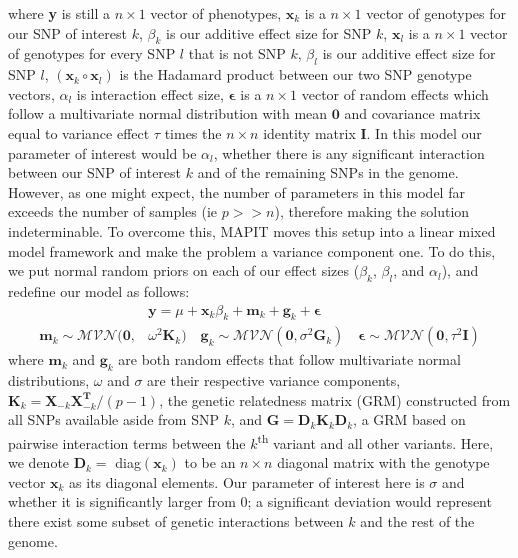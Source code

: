 \documentclass[12pt,a4paper]{article}
\begin{document}
where \textbf{y} is still a $n \times 1$ vector of phenotypes, $\textbf{x}_k$ is a $n \times 1$ vector of genotypes for our SNP of interest $k$, $\beta_k$ is our additive effect size for SNP $k$, $\textbf{x}_l$ is a $n \times 1$ vector of genotypes for every SNP $l$ that is not SNP $k$, $\beta_l$ is our additive effect size for SNP $l$, $(\textbf{x}_k \circ \textbf{x}_l)$ is the Hadamard product between our two SNP genotype vectors, $\alpha_l$ is interaction effect size, $\boldsymbol{\epsilon}$ is a $n \times 1$ vector of random effects which follow a multivariate normal distribution with mean $\textbf{0}$ and covariance matrix equal to variance effect $\tau$ times the $n \times n$ identity matrix $\textbf{I}$. In this model our parameter of interest would be $\alpha_l$, whether there is any significant interaction between our SNP of interest $k$ and of the remaining SNPs in the genome. However, as one might expect, the number of parameters in this model far exceeds the number of samples (ie $p >> n$), therefore making the solution indeterminable. To overcome this, MAPIT moves this setup into a linear mixed model framework and make the problem a variance component one. To do this, we put normal random priors on each of our effect sizes ($\beta_k$, $\beta_l$, and $\alpha_l$), and redefine our model as follows:
\begin{align}
    & \textbf{y} = \mu + \textbf{x}_k\beta_k + \textbf{m}_k + \textbf{g}_k + \boldsymbol{\epsilon} \\
    \textbf{m}_k \sim \mathcal{MVN}(\textbf{0}, &\omega^{2}\textbf{K}_k) \quad \textbf{g}_k \sim \mathcal{MVN}(\textbf{0}, \sigma^{2}\textbf{G}_k) \quad \boldsymbol{\epsilon} \sim \mathcal{MVN}(\textbf{0}, \tau^{2}\textbf{I}) \nonumber 
\end{align}
where $\textbf{m}_k$ and $\textbf{g}_k$ are both random effects that follow multivariate normal distributions, $\omega$ and $\sigma$ are their respective variance components, $\textbf{K}_k = \textbf{X}_{-k}\textbf{X}^{\textbf{T}}_{-k}/(p-1)$, the genetic relatedness matrix (GRM) constructed from all SNPs available aside from SNP $k$, and $\textbf{G} = \textbf{D}_k\textbf{K}_k\textbf{D}_k$, a GRM based on pairwise interaction terms between the $k$\textsuperscript{th} variant and all other variants. Here, we denote $\textbf{D}_k =$ diag$(\textbf{x}_k)$ to be an $n \times n$ diagonal matrix with the genotype vector $\textbf{x}_k$ as its diagonal elements. Our parameter of interest here is $\sigma$ and whether it is significantly larger from 0; a significant deviation would represent there exist some subset of genetic interactions between $k$ and the rest of the genome.
\end{document}

